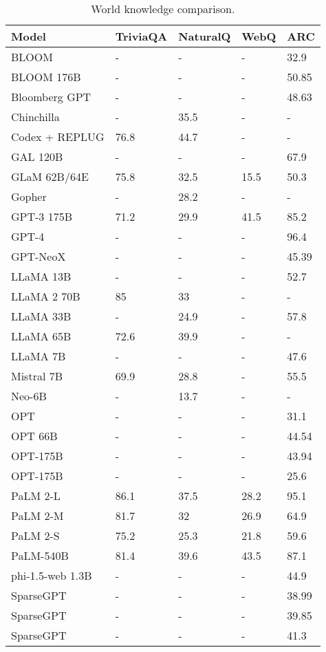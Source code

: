 \documentclass[conference]{IEEEtran}
\begin{document}
\begin{table}[H]
    \centering
    \caption{World knowledge comparison.}\label{tab:world_knowledge}
    \begin{tabular}{|l|l|l|l|l|}
    \hline
        Model & TriviaQA & NaturalQ & WebQ & ARC \\ \hline
BLOOM & - & - & - & 32.9\\ \hline
BLOOM 176B & - & - & - & 50.85\\ \hline
Bloomberg GPT & - & - & - & 48.63\\ \hline
Chinchilla & - & 35.5 & - & -\\ \hline
Codex + REPLUG & 76.8 & 44.7 & - & -\\ \hline
GAL 120B & - & - & - & 67.9\\ \hline
GLaM 62B/64E & 75.8 & 32.5 & 15.5 & 50.3\\ \hline
Gopher & - & 28.2 & - & -\\ \hline
GPT-3 175B & 71.2 & 29.9 & 41.5 & 85.2\\ \hline
GPT-4 & - & - & - & 96.4\\ \hline
GPT-NeoX & - & - & - & 45.39\\ \hline
LLaMA 13B & - & - & - & 52.7\\ \hline
LLaMA 2 70B & 85 & 33 & - & -\\ \hline
LLaMA 33B & - & 24.9 & - & 57.8\\ \hline
LLaMA 65B & 72.6 & 39.9 & - & -\\ \hline
LLaMA 7B & - & - & - & 47.6\\ \hline
Mistral 7B & 69.9 & 28.8 & - & 55.5\\ \hline
Neo-6B & - & 13.7 & - & -\\ \hline
OPT & - & - & - & 31.1\\ \hline
OPT 66B & - & - & - & 44.54\\ \hline
OPT-175B & - & - & - & 43.94\\ \hline
OPT-175B & - & - & - & 25.6\\ \hline
PaLM 2-L & 86.1 & 37.5 & 28.2 & 95.1\\ \hline
PaLM 2-M & 81.7 & 32 & 26.9 & 64.9\\ \hline
PaLM 2-S & 75.2 & 25.3 & 21.8 & 59.6\\ \hline
PaLM-540B & 81.4 & 39.6 & 43.5 & 87.1\\ \hline
phi-1.5-web 1.3B & - & - & - & 44.9\\ \hline
SparseGPT & - & - & - & 38.99\\ \hline
SparseGPT & - & - & - & 39.85\\ \hline
SparseGPT & - & - & - & 41.3\\ \hline
    \end{tabular}
\end{table}
\end{document}
